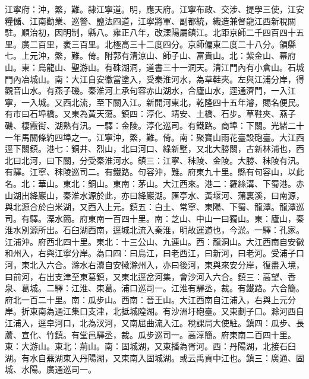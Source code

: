 \begin{pinyinscope}
江寧府：沖，繁，難。隸江寧道。明，應天府。江寧布政、交涉、提學三使，江安糧儲、江南勸業、巡警、鹽法四道，江寧將軍、副都統，織造兼督龍江西新稅關駐。順治初，因明制，縣八。雍正八年，改溧陽屬鎮江。北距京師二千四百四十五里。廣二百里，袤三百里。北極高三十二度四分。京師偏東二度二十八分。領縣七。上元沖，繁，難。倚。附郭有清涼山、師子山、富貴山。北：紫金山、幕府山。東：烏龍山、聖游山。有硃湖洞，道書三十一洞天。清江門內有小倉山。石城門內冶城山。南：大江自安徽當塗入，受秦淮河水，為草鞋夾。左與江浦分岸，得觀音山水。有燕子磯。秦淮河上承句容赤山湖水，合廬山水，逕通濟門，一入江寧，一入城。又西北流，至下關入江。新開河東北，乾隆四十五年濬，賜名便民。有市曰石埠橋。又東為黃天蕩。鎮四：淳化、靖安、土橋、石步。草鞋夾、燕子磯、棲霞街、湖熟有汛。一驛：金陵。淳化巡司。有鐵路。商埠：下關。光緒二十一年馬關條約四埠之一。江寧沖，繁，難。倚。南：聚寶山雨花臺設砲臺。大江西逕下關鎮。港七：銅井、烈山，北曰河口、綠新墅，又北大勝關，古新林浦也，西北曰北河，曰下關，分受秦淮河水。鎮三：江寧、秣陵、金陵。大勝、秣陵有汛。有驛。江寧、秣陵巡司二。有鐵路。句容沖，難。府東九十里。縣有句容山，以此名。北：華山。東北：銅山。東南：茅山。大江西來。港二：羅絲溝、下蜀港。赤山湖出絳巖山，秦淮水源於此，亦曰絳巖湖。匯亭水、黃堰河、蒲裏溪，曰南源，與北源合於白米湖，又西入上元。鎮五：白土、常寧、東陽、下蜀、龍潭。龍潭巡司。有驛。溧水簡。府東南一百四十里。南：芝山、中山一曰獨山。東：廬山，秦淮水別源所出。石臼湖西南，逕城北流入秦淮，明故運道也，今淤。一驛：孔家。江浦沖。府西北四十里。東北：十三公山、九連山。西：龍洞山。大江西南自安徽和州入，右與江寧分岸。為口四：曰烏江，曰老西江，曰新河，曰老河。受浦子口河，東北入六合。滁水右瀆自安徽滁州入，亦曰後河，東與來安分岸，復盡入境，曰前河，右出支津至東葛鎮，又東北逕岔河集，會沙河入六合。鎮三：高望、香泉、葛城。二驛：江淮、東葛。浦口巡司一。江淮有驛丞，裁。有鐵路。六合簡。府北一百二十里。南：瓜步山。西南：晉王山。大江西南自江浦入，右與上元分岸。折東南為通江集口支津，北抵城隍湖。有沙洲圩砲臺。又東劃子口。滁河西自江浦入，逕皁河口，北為汊河，又南屈曲流入江。稅課局大使駐。鎮四：瓜步、長蘆、宣化、竹鎮。有堂邑驛丞，裁。瓜步巡司一。高淳簡。府東南二百四十里。東：大游山。東北：荊山。南：固城湖，又東播為胥河。西：丹陽湖，北接石臼湖。有水自蕪湖東入丹陽湖，又東南入固城湖。或云禹貢中江也。鎮三：廣通、固城、水陽。廣通巡司一。


\end{pinyinscope}
